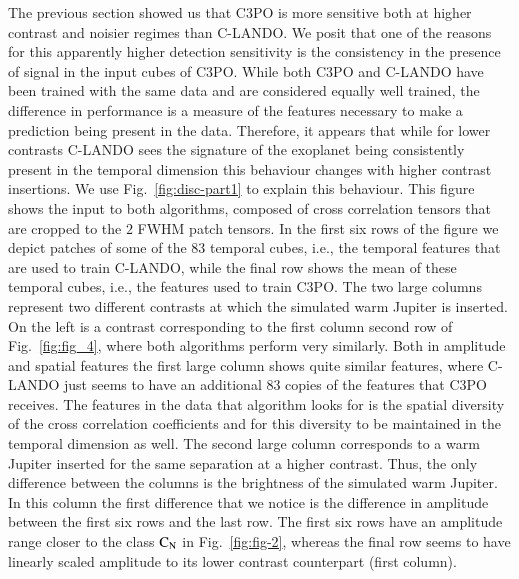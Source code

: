 \documentclass{aa}
\begin{document}
The previous section showed us that C3PO is more sensitive both at higher contrast and noisier regimes than C-LANDO.
We posit that one of the reasons for this apparently higher detection sensitivity is the consistency in the presence of signal in the input cubes of C3PO.
While both C3PO and C-LANDO have been trained with the same data and are considered equally well trained, the difference in performance is a measure of the features necessary to make a prediction being present in the data.
Therefore, it appears that while for lower contrasts C-LANDO sees the signature of the exoplanet being consistently present in the temporal dimension this behaviour changes with higher contrast insertions.
We use Fig.~\ref{fig:disc-part1} to explain this behaviour.
This figure shows the input to both algorithms, composed of cross correlation tensors that are cropped to the $2$ FWHM patch tensors.
In the first six rows of the figure we depict patches of some of the $83$ temporal cubes, i.e., the temporal features that are used to train C-LANDO, while the final row shows the mean of these temporal cubes, i.e., the features used to train C3PO.
The two large columns represent two different contrasts at which the simulated warm Jupiter is inserted. On the left is a contrast corresponding to the first column second row of Fig.~\ref{fig:fig_4}, where both algorithms perform very similarly.
Both in amplitude and spatial features the first large column shows quite similar features, where C-LANDO just seems to have an additional $83$ copies of the features that C3PO receives. 
The features in the data that algorithm looks for is the spatial diversity of the cross correlation coefficients and for this diversity to be maintained in the temporal dimension as well.
The second large column corresponds to a warm Jupiter inserted for the same separation at a higher contrast.
Thus, the only difference between the columns is the brightness of the simulated warm Jupiter.
In this column the first difference that we notice is the difference in amplitude between the first six rows and the last row.
The first six rows have an amplitude range closer to the class $\rm{C_N}$ in Fig.~\ref{fig:fig-2}, whereas the final row seems to have linearly scaled amplitude to its lower contrast counterpart (first column).
\end{document}
